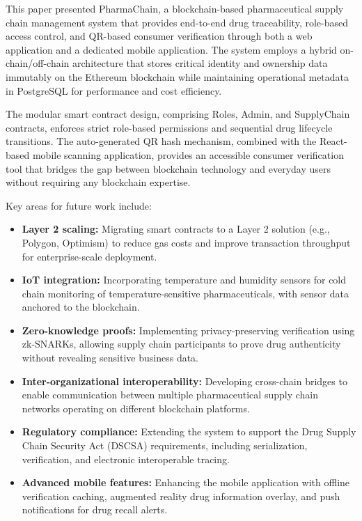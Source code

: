 \documentclass[conference]{IEEEtran}
\begin{document}
This paper presented PharmaChain, a blockchain-based pharmaceutical supply chain management system that provides end-to-end drug traceability, role-based access control, and QR-based consumer verification through both a web application and a dedicated mobile application. The system employs a hybrid on-chain/off-chain architecture that stores critical identity and ownership data immutably on the Ethereum blockchain while maintaining operational metadata in PostgreSQL for performance and cost efficiency.

The modular smart contract design, comprising Roles, Admin, and SupplyChain contracts, enforces strict role-based permissions and sequential drug lifecycle transitions. The auto-generated QR hash mechanism, combined with the React-based mobile scanning application, provides an accessible consumer verification tool that bridges the gap between blockchain technology and everyday users without requiring any blockchain expertise.

Key areas for future work include:

\begin{itemize}
\item \textbf{Layer 2 scaling:} Migrating smart contracts to a Layer 2 solution (e.g., Polygon, Optimism) to reduce gas costs and improve transaction throughput for enterprise-scale deployment.
\item \textbf{IoT integration:} Incorporating temperature and humidity sensors for cold chain monitoring of temperature-sensitive pharmaceuticals, with sensor data anchored to the blockchain.
\item \textbf{Zero-knowledge proofs:} Implementing privacy-preserving verification using zk-SNARKs, allowing supply chain participants to prove drug authenticity without revealing sensitive business data.
\item \textbf{Inter-organizational interoperability:} Developing cross-chain bridges to enable communication between multiple pharmaceutical supply chain networks operating on different blockchain platforms.
\item \textbf{Regulatory compliance:} Extending the system to support the Drug Supply Chain Security Act (DSCSA) requirements, including serialization, verification, and electronic interoperable tracing.
\item \textbf{Advanced mobile features:} Enhancing the mobile application with offline verification caching, augmented reality drug information overlay, and push notifications for drug recall alerts.
\end{itemize}
\end{document}

